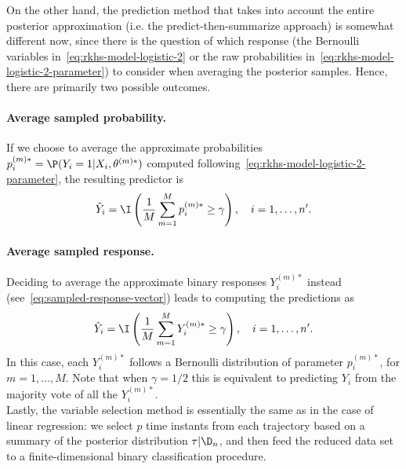 On the other hand, the prediction method that takes into account the entire posterior approximation (i.e. the predict-then-summarize approach) is somewhat different now, since there is the question of which response (the Bernoulli variables in~\eqref{eq:rkhs-model-logistic-2} or the raw probabilities in~\eqref{eq:rkhs-model-logistic-2-parameter}) to consider when averaging the posterior samples. Hence, there are primarily two possible outcomes.

  \paragraph{Average sampled probability.} If we choose to average the approximate probabilities \(p_i^{(m)*} = \P(Y_i =1 | X_i,\theta^{(m)*})\) computed following~\eqref{eq:rkhs-model-logistic-2-parameter}, the resulting predictor is
  \[
    \hat Y_i = \I\left(\frac{1}{M} \sum_{m=1}^M p_i^{(m)*} \geq \gamma\right), \quad i=1,\dots,n'.
  \]
  \paragraph{Average sampled response.} Deciding to average the approximate binary responses \(Y_i^{(m)*}\) instead (see~\eqref{eq:sampled-response-vector}) leads to computing the predictions as
  \[
    \hat Y_i = \I\left(\frac{1}{M} \sum_{m=1}^M Y_i^{(m)*} \geq \gamma\right), \quad i=1,\dots,n'.
  \]
  In this case, each \(Y_i^{(m)*}\) follows a Bernoulli distribution of parameter \(p_i^{(m)*}\), for \(m=1,\dots,M\). Note that when \(\gamma=1/2\) this is equivalent to predicting \(Y_i\) from the majority vote of all the \(Y_i^{(m)*}\).\\

Lastly, the variable selection method is essentially the same as in the case of linear regression: we select \(p\) time instants from each trajectory based on a summary of the posterior distribution \(\tau | \D_n\), and then feed the reduced data set to a finite-dimensional binary classification procedure.
